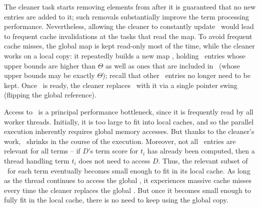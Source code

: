 The cleaner task starts removing elements from  \DMap\/ after it is guaranteed that 
no new entries are added to  it; such removals substantially improve the term processing performance. 
Nevertheless, allowing the cleaner to constantly update \DMap\ would lead to frequent cache invalidations at the
tasks that read the map. 
To avoid frequent cache misses, 
the global map is kept read-only most of the time, while the cleaner works on a local copy: 
it  
repeatedly builds a new map \LDMap, holding \DMap\ entries whose upper bounds 
are higher than $\Theta$ as well as ones that are included in \DHeap\ (whose upper bounds may be exactly $\Theta$); recall that other \DMap\ entries no longer need to be kept. 
Once \LDMap\ is ready, the cleaner replaces \DMap\ with it via a single pointer swing 
(flipping the global reference). 




Access to \DMap\ is a principal performance bottleneck, since it is frequently read by all worker threads. Initially, it is too large to fit into local caches, and so the parallel execution inherently requires global memory accesses. But thanks to the cleaner's work, \DMap\ shrinks in the course of the execution. 
Moreover, not all  \DMap\ entries are relevant for all terms -- if $D$'s term score for $t_i$ has already been computed, then a  thread handling term $t_i$ does not need to access $D$.
Thus, the relevant subset of  \DMap\ for each term eventually becomes small enough to fit in its local cache. As long as the thread continues to access the global \DMap,  it  experiences massive cache misses every time the cleaner replaces the global \DMap. 
But 
once it becomes small enough to fully fit in the local cache, there is no need to keep using the global copy. 

